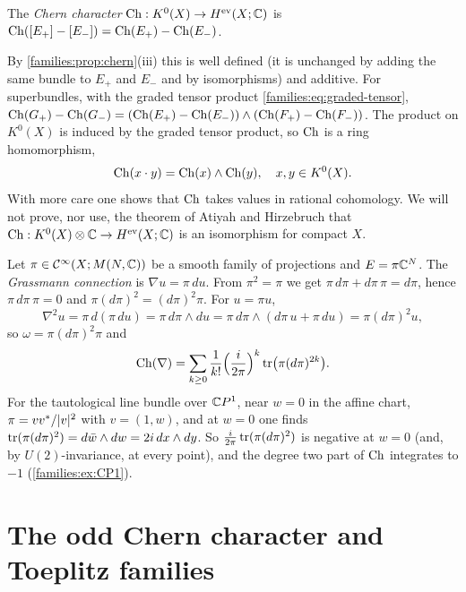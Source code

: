 \begin{definition}\label{families:def:Ch-K}
  The \emph{Chern character} $\operatorname{Ch}:K^0(X)\to H^{\mathrm{ev}}(X;\mathbb{C})$ is
  $\operatorname{Ch}([E_+]-[E_-])=\operatorname{Ch}(E_+)-\operatorname{Ch}(E_-)$.
\end{definition}

By \cref{families:prop:chern}(iii) this is well defined (it is unchanged by
adding the same bundle to $E_+$ and $E_-$ and by isomorphisms) and additive.
For superbundles, with the graded tensor product
\eqref{families:eq:graded-tensor},
$\operatorname{Ch}(G_+)-\operatorname{Ch}(G_-)=(\operatorname{Ch}(E_+)-\operatorname{Ch}(E_-))\wedge(\operatorname{Ch}(F_+)-\operatorname{Ch}(F_-))$. The product
on $K^0(X)$ is induced by the graded tensor product, so $\operatorname{Ch}$ is a ring
homomorphism,
\begin{equation*}
  \operatorname{Ch}(x\cdot y)=\operatorname{Ch}(x)\wedge\operatorname{Ch}(y),\quad x,y\in K^0(X).
\end{equation*}
With more care one shows that $\operatorname{Ch}$ takes values in rational cohomology. We
will not prove, nor use, the theorem of Atiyah and Hirzebruch that
$\operatorname{Ch}:K^0(X)\otimes\mathbb{C}\to H^{\mathrm{ev}}(X;\mathbb{C})$ is an isomorphism for compact $X$.

\begin{example}\label{families:ex:grassmann}
  Let $\pi\in\mathcal{C}^\infty(X;M(N,\mathbb{C}))$ be a smooth family of projections and
  $E=\pi\mathbb{C}^N$. The \emph{Grassmann connection} is $\nabla u=\pi\,du$. From
  $\pi^2=\pi$ we get $\pi\,d\pi+d\pi\,\pi=d\pi$, hence $\pi\,d\pi\,\pi=0$ and
  $\pi(d\pi)^2=(d\pi)^2\pi$. For $u=\pi u$,
  \begin{equation*}
    \nabla^2u=\pi\,d(\pi\,du)=\pi\,d\pi\wedge du=\pi\,d\pi\wedge(d\pi\,u+\pi\,
    du)=\pi(d\pi)^2u,
  \end{equation*}
  so $\omega=\pi(d\pi)^2\pi$ and
  \begin{equation}\label{families:eq:Ch-projection}
    \operatorname{Ch}(\nabla)=\sum_{k\ge0}\frac{1}{k!}\Bigl(\frac{i}{2\pi}\Bigr)^k
    \operatorname{tr}\bigl(\pi(d\pi)^{2k}\bigr).
  \end{equation}
  For the tautological line bundle over $\mathbb{C} P^1$, near $w=0$ in the
  affine chart, $\pi=vv^*/\lvert v\rvert^2$ with $v=(1,w)$, and at $w=0$ one finds
  $\operatorname{tr}(\pi(d\pi)^2)=d\bar w\wedge dw=2i\,dx\wedge dy$. So
  $\frac{i}{2\pi}\operatorname{tr}(\pi(d\pi)^2)$ is negative at $w=0$ (and, by
  $U(2)$-invariance, at every point), and the degree two part of $\operatorname{Ch}$ integrates to $-1$
  (\cref{families:ex:CP1}).
\end{example}

\section{The odd Chern character and Toeplitz families}\label{families:sec:toeplitz}

